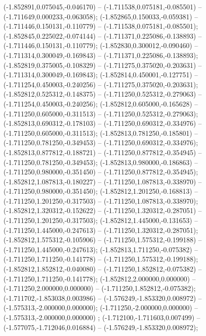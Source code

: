  (-1.852891,0.075045,-0.046170) -- (-1.711538,0.075181,-0.085501) -- (-1.711649,0.000233,-0.063058);
 (-1.852865,0.150033,-0.059381) -- (-1.711446,0.150131,-0.110779) -- (-1.711538,0.075181,-0.085501);
 (-1.852845,0.225022,-0.074144) -- (-1.711371,0.225086,-0.138893) -- (-1.711446,0.150131,-0.110779);
 (-1.852830,0.300012,-0.090460) -- (-1.711314,0.300049,-0.169843) -- (-1.711371,0.225086,-0.138893);
 (-1.852819,0.375005,-0.108329) -- (-1.711275,0.375020,-0.203631) -- (-1.711314,0.300049,-0.169843);
 (-1.852814,0.450001,-0.127751) -- (-1.711254,0.450003,-0.240256) -- (-1.711275,0.375020,-0.203631);
 (-1.852812,0.525312,-0.148375) -- (-1.711250,0.525312,-0.279063) -- (-1.711254,0.450003,-0.240256);
 (-1.852812,0.605000,-0.165628) -- (-1.711250,0.605000,-0.311513) -- (-1.711250,0.525312,-0.279063);
 (-1.852813,0.690312,-0.178103) -- (-1.711250,0.690312,-0.334976) -- (-1.711250,0.605000,-0.311513);
 (-1.852813,0.781250,-0.185801) -- (-1.711250,0.781250,-0.349453) -- (-1.711250,0.690312,-0.334976);
 (-1.852813,0.877812,-0.188721) -- (-1.711250,0.877812,-0.354945) -- (-1.711250,0.781250,-0.349453);
 (-1.852813,0.980000,-0.186863) -- (-1.711250,0.980000,-0.351450) -- (-1.711250,0.877812,-0.354945);
 (-1.852812,1.087813,-0.180227) -- (-1.711250,1.087813,-0.338970) -- (-1.711250,0.980000,-0.351450);
 (-1.852812,1.201250,-0.168813) -- (-1.711250,1.201250,-0.317503) -- (-1.711250,1.087813,-0.338970);
 (-1.852812,1.320312,-0.152622) -- (-1.711250,1.320312,-0.287051) -- (-1.711250,1.201250,-0.317503);
 (-1.852812,1.445000,-0.131653) -- (-1.711250,1.445000,-0.247613) -- (-1.711250,1.320312,-0.287051);
 (-1.852812,1.575312,-0.105906) -- (-1.711250,1.575312,-0.199188) -- (-1.711250,1.445000,-0.247613);
 (-1.852813,1.711250,-0.075382) -- (-1.711250,1.711250,-0.141778) -- (-1.711250,1.575312,-0.199188);
 (-1.852812,1.852812,-0.040080) -- (-1.711250,1.852812,-0.075382) -- (-1.711250,1.711250,-0.141778);
 (-1.852812,2.000000,0.000000) -- (-1.711250,2.000000,0.000000) -- (-1.711250,1.852812,-0.075382);
 (-1.711702,-1.853038,0.003986) -- (-1.576249,-1.853320,0.008972) -- (-1.575313,-2.000000,0.000000);
 (-1.711250,-2.000000,0.000000) -- (-1.575313,-2.000000,0.000000) ;
 (-1.712100,-1.711603,0.007499) -- (-1.577075,-1.712046,0.016884) -- (-1.576249,-1.853320,0.008972);
